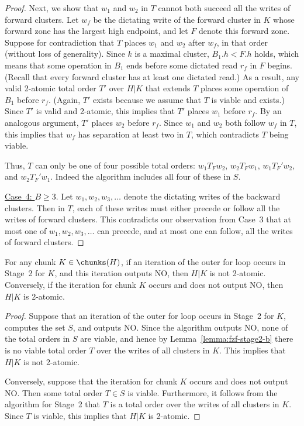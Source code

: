 \begin{lemma}
\begin{proof}
Next, we show that $w_1$ and $w_2$ in $T$ cannot both succeed all the writes of forward clusters.
Let $w_f$ be the dictating write of the forward cluster in $K$ whose forward zone has the largest high endpoint,
and let $F$ denote this forward zone.
Suppose for contradiction that $T$ places $w_1$ and $w_2$ after $w_f$, in that order (without loss of generality).
Since $k$ is a maximal cluster, $B_1.h < F.h$ holds, which means that some operation in $B_1$
ends before some dictated read $r_f$ in $F$ begins.
(Recall that every forward cluster has at least one dictated read.)
As a result, any valid 2-atomic total order $T'$ over $H|K$ that extends $T$ places some operation of $B_1$ before $r_f$.  
(Again, $T'$ exists because we assume that $T$ is viable and exists.)
Since $T'$ is valid and 2-atomic, this implies that $T'$ places $w_1$ before $r_f$.
By an analogous argument, $T'$ places $w_2$ before $r_f$.
Since $w_1$ and $w_2$ both follow $w_f$ in $T$, this implies that $w_f$ has separation at least two in $T$,
which contradicts $T$ being viable.

Thus, $T$ can only be one of four possible total orders:
$w_1 T_F w_2$, $w_2 T_F w_1$, $w_1 T_F' w_2$, and $w_2 T_F' w_1$.
Indeed the algorithm includes all four of these in $S$.

\noindent\underline{Case~4: $B \geq 3$}.
Let $w_1,w_2,w_3, \ldots$ denote the dictating writes of the backward clusters.
Then in $T$, each of these writes must either precede or follow all the writes of forward clusters.
This contradicts our observation from Case~3 that at most one of $w_1,w_2,w_3, \ldots$ can precede,
and at most one can follow, all the writes of forward clusters.
\end{proof}
\end{lemma}

\begin{lemma}
\label{lemma:fzf-stage2-c}
For any chunk $K \in \chunks(H)$, if an iteration of the outer for loop occurs in Stage~2 for $K$,
and this iteration outputs NO, then $H|K$ is not 2-atomic.
Conversely, if the iteration for chunk $K$ occurs and does not output NO, then $H|K$ is 2-atomic.
\begin{proof}
Suppose that an iteration of the outer for loop occurs in Stage~2 for $K$, computes the set $S$, and outputs NO.
Since the algorithm outputs NO, none of the total orders in $S$ are viable, and hence by 
Lemma~\ref{lemma:fzf-stage2-b} there is no viable total order $T$ over the writes of all clusters in $K$.
This implies that $H|K$ is not 2-atomic.

Conversely, suppose that the iteration for chunk $K$ occurs and does not output NO.
Then some total order $T \in S$ is viable.
Furthermore, it follows from the algorithm for Stage~2 that $T$ is a total order
over the writes of all clusters in $K$.
Since $T$ is viable, this implies that $H|K$ is 2-atomic.
\end{proof}
\end{lemma}

